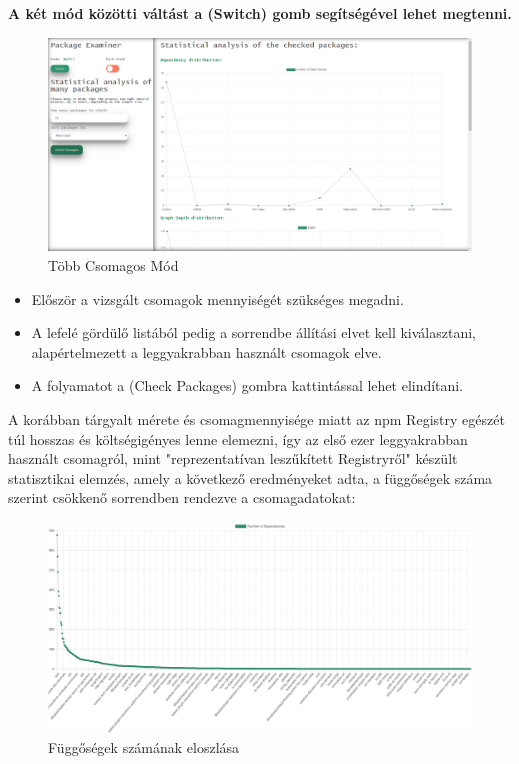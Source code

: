 \textbf{A két mód közötti váltást a (Switch) gomb segítségével lehet megtenni.}

\begin{figure}[!h]
	\centering
	\includegraphics[scale=0.2]{images/statistics.png}
	\caption{Több Csomagos Mód}
	\label{fig:examiner}
\end{figure}

\begin{itemize}
	\item Először a vizsgált csomagok mennyiségét szükséges megadni.
	\item A lefelé gördülő listából pedig a sorrendbe állítási elvet kell kiválasztani, alapértelmezett a leggyakrabban használt csomagok elve.
	\item A folyamatot a (Check Packages) gombra kattintással lehet elindítani.
\end{itemize}


A korábban tárgyalt mérete és csomagmennyisége miatt az npm Registry egészét túl hosszas és költségigényes lenne elemezni, így az első ezer leggyakrabban használt csomagról, mint "reprezentatívan leszűkített Registryről" készült statisztikai elemzés, amely a következő eredményeket adta, a függőségek száma szerint csökkenő sorrendben rendezve a csomagadatokat:

\begin{figure}[!h]
	\centering
	\includegraphics[scale=0.12]{images/depdist.png}
	\caption{Függőségek számának eloszlása}
	\label{fig:depdist}
\end{figure}  

